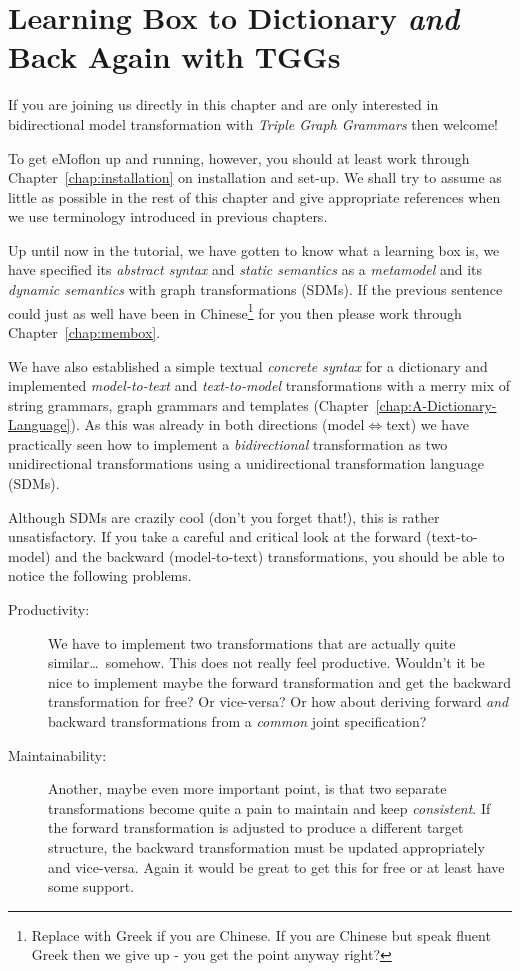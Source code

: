 \chapter{Learning Box to Dictionary \emph{and} Back Again with TGGs}
\label{chap:Learning-Box-to-Dictionary-and-Back-Again}

If you are joining us directly in this chapter and are only interested in bidirectional model transformation with \emph{Triple Graph Grammars} then welcome!

To get eMoflon up and running, however, you should at least work through Chapter~\ref{chap:installation} on installation and set-up.
We shall try to assume as little as possible in the rest of this chapter and give appropriate references when we use terminology introduced in previous chapters.

Up until now in the tutorial, we have gotten to know what a learning box is, we have specified its \emph{abstract syntax} and \emph{static semantics} as a \emph{metamodel} and its \emph{dynamic semantics} with graph transformations (SDMs).
If the previous sentence could just as well have been in Chinese\footnote{Replace with Greek if you are Chinese.  If you are Chinese but speak fluent Greek then we give up - you get the point anyway right?} for you then please work through Chapter~\ref{chap:membox}.

We have also established a simple textual \emph{concrete syntax} for a dictionary and implemented \emph{model-to-text} and \emph{text-to-model} transformations with a merry mix of string grammars, graph grammars and templates (Chapter~\ref{chap:A-Dictionary-Language}).
As this was already in both directions (model$\Leftrightarrow$text) we have practically seen how to implement a \emph{bidirectional} transformation as two unidirectional transformations using a unidirectional transformation language (SDMs).

Although SDMs are crazily cool (don't you forget that!), this is rather unsatisfactory.  
If you take a careful and critical look at the forward (text-to-model) and the backward (model-to-text) transformations, you should be able to notice the following problems.
\begin{description}
  \item[Productivity:] We have to implement two transformations that are actually quite similar\ldots ~somehow.  This does not really feel productive.  Wouldn't it be nice to implement maybe the forward transformation and get the backward transformation for free?  Or vice-versa?  Or how about deriving forward \emph{and} backward transformations from a \emph{common} joint specification?
  \item[Maintainability:] Another, maybe even more important point, is that two separate transformations become quite a pain to maintain and keep \emph{consistent}.  If the forward transformation is adjusted to produce a different target structure, the backward transformation must be updated appropriately and vice-versa.  Again it would be great to get this for free or at least have some support. 
\end{description}

